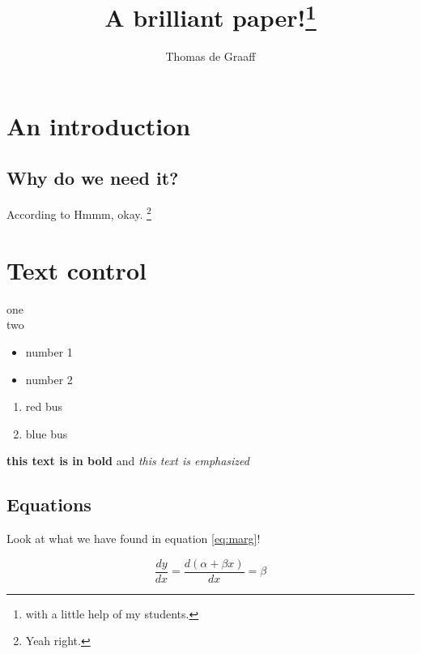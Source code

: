 \documentclass[]{article}
\title{A brilliant paper!\footnote{with a little help of my students.}}
\author{Thomas de Graaff}
\begin{document}
\maketitle

\begin{abstract}
\lipsum[1]
\end{abstract}

\section{An introduction}

\subsection{Why do we need it?}

\lipsum[2]
According to \citet{Braysy2009,Cruijssen2007, Cruijssen2007a} \lipsum[2]
Hmmm, okay. \footnote{Yeah right.}

\section{Text control}

\begin{description}
	\item[one] \lipsum[1]
	\item[two] \lipsum[1]
\end{description}

\begin{itemize}
	\item number 1
	\item number 2
\end{itemize}

\begin{enumerate}
	\item red bus
	\item blue bus
\end{enumerate}

\textbf{this text is in bold} and \emph{this text is emphasized}

\subsection{Equations}

Look at what we have found in equation \ref{eq:marg}!

\begin{equation}
	\frac{dy}{dx} = \frac{d(\alpha + \beta x)}{dx} = \beta
	\label{eq:marg}
\end{equation}
\end{document}
